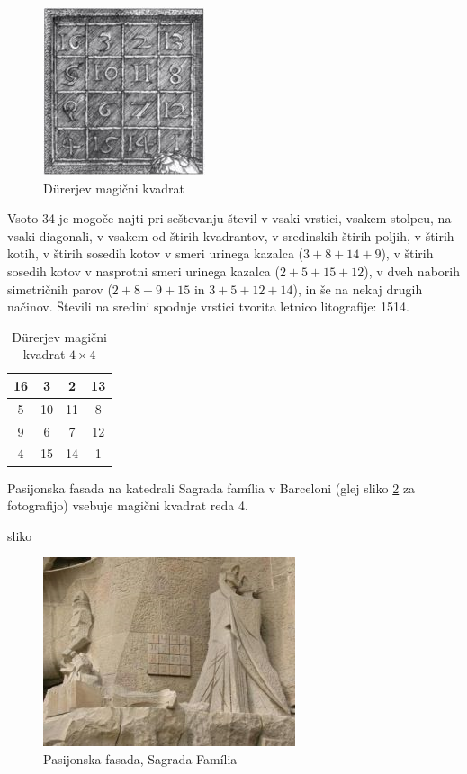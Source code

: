\documentclass[a4paper,12pt]{article}
\newenvironment{magic}[3]{
   \begin{table}
      \centering
      \caption{#2}
      \label{#3}
      \Large
      \begin{tabular}{|*{#1}{c|}}\hline
}{
\end{tabular}
\end{table}
}
\begin{document}
\begin{figure}[!ht]
   \centering
   \caption{Dürerjev magični kvadrat}
   \label{fig:durer}
   \includegraphics[scale=1.5]{durer.png}
\end{figure}


Vsoto 34 je mogoče najti pri seštevanju števil v vsaki vrstici, vsakem stolpcu,
na vsaki diagonali, v vsakem od štirih kvadrantov, v sredinskih štirih poljih,
v štirih kotih, v štirih sosedih kotov v smeri urinega kazalca ($3+8+14+9$), v
štirih sosedih kotov v nasprotni smeri urinega kazalca ($2+5+15+12$), v dveh naborih
simetričnih parov ($2+8+9+15$ in $3+5+12+14$), in še na nekaj drugih načinov.
Števili na sredini spodnje vrstici tvorita letnico litografije: 1514.
%


\begin{magic}{4}{Dürerjev magični kvadrat $4\times 4$}{table:durer}
         16 &  3 &  2 & 13 \\\hline
          5 & 10 & 11 &  8 \\\hline
          9 &  6 &  7 & 12 \\\hline
          4 & 15 & 14 &  1 \\\hline
\end{magic}

Pasijonska fasada na katedrali Sagrada família v Barceloni
(glej sliko \ref{fig:sagrada} za fotografijo) vsebuje magični kvadrat reda 4.

sliko
\begin{figure}[!ht]
   \centering
   \caption{Pasijonska fasada, Sagrada Família}
   \label{fig:sagrada}
   \includegraphics[scale=1.5]{sagrada.png} 
\end{figure}
\end{document}
